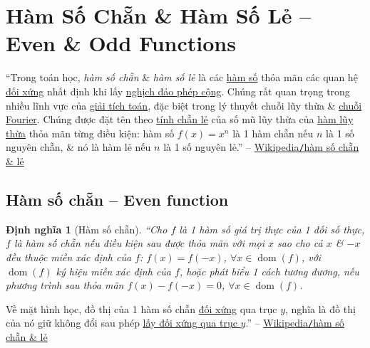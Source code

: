 \documentclass[oneside]{book}
\numberwithin{equation}{section}
\newtheorem{dinhnghia}{Định nghĩa}[section]
\begin{document}
\section{Hàm Số Chẵn \& Hàm Số Lẻ -- Even \& Odd Functions}
\label{sect: even & odd functions}
``Trong toán học, \textit{hàm số chẵn} \& \textit{hàm số lẻ} là các \href{https://vi.wikipedia.org/wiki/H%C3%A0m_s%E1%BB%91}{hàm số} thỏa mãn các quan hệ \href{https://vi.wikipedia.org/wiki/%C4%90%E1%BB%91i_x%E1%BB%A9ng}{đối xứng} nhất định khi lấy \href{https://vi.wikipedia.org/wiki/Ngh%E1%BB%8Bch_%C4%91%E1%BA%A3o_ph%C3%A9p_c%E1%BB%99ng}{nghịch đảo phép cộng}. Chúng rất quan trọng trong nhiều lĩnh vực của \href{https://vi.wikipedia.org/wiki/Gi%E1%BA%A3i_t%C3%ADch_to%C3%A1n}{giải tích toán}, đặc biệt trong lý thuyết chuỗi lũy thừa \& \href{https://vi.wikipedia.org/wiki/Chu%E1%BB%97i_Fourier}{chuỗi Fourier}. Chúng được đặt tên theo \href{https://vi.wikipedia.org/wiki/T%C3%ADnh_ch%E1%BA%B5n_l%E1%BA%BB}{tính chẵn lẻ} của số mũ lũy thừa của \href{https://vi.wikipedia.org/wiki/L%C5%A9y_th%E1%BB%ABa}{hàm lũy thừa} thỏa mãn từng điều kiện: hàm số $f(x) = x^n$ là 1 hàm chẵn nếu $n$ là 1 số nguyên chẵn, \& nó là hàm lẻ nếu $n$ là 1 số nguyên lẻ.'' -- \href{https://vi.wikipedia.org/wiki/H%C3%A0m_s%E1%BB%91_ch%E1%BA%B5n_v%C3%A0_l%E1%BA%BB}{Wikipedia\texttt{/}hàm số chẵn \& lẻ}

\subsection{Hàm số chẵn -- Even function}

\begin{dinhnghia}[Hàm số chẵn]
	``Cho $f$ là 1 hàm số giá trị thực của 1 đối số thực, $f$ là \emph{hàm số chẵn} nếu điều kiện sau được thỏa mãn với mọi $x$ sao cho cả $x$ \& $-x$ đều thuộc miền xác định của $f$: $f(x) = f(-x)$, $\forall x\in\operatorname{dom}(f)$, với $\operatorname{dom}(f)$ ký hiệu miền xác định của $f$, hoặc phát biểu 1 cách tương đương, nếu phương trình sau thỏa mãn $f(x) - f(-x) = 0$, $\forall x\in\operatorname{dom}(f)$.
\end{dinhnghia}
Về mặt hình học, đồ thị của 1 hàm số chẵn \href{https://vi.wikipedia.org/wiki/%C4%90%E1%BB%91i_x%E1%BB%A9ng}{đối xứng} qua trục $y$, nghĩa là đồ thị của nó giữ không đổi sau phép \href{https://vi.wikipedia.org/wiki/%C4%90%E1%BB%91i_x%E1%BB%A9ng_tr%E1%BB%A5c}{lấy đối xứng qua trục $y$}.'' -- \href{https://vi.wikipedia.org/wiki/H%C3%A0m_s%E1%BB%91_ch%E1%BA%B5n_v%C3%A0_l%E1%BA%BB}{Wikipedia\texttt{/}hàm số chẵn \& lẻ}
\end{document}
